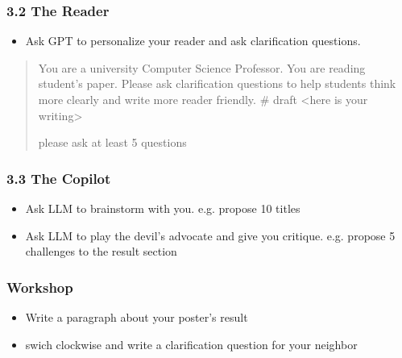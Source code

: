 \documentclass{beamer}
\begin{document}
\begin{frame}
    \frametitle{3.2 The Reader}
    \begin{itemize}
        \item Ask GPT to personalize your reader and ask clarification questions.
    \end{itemize}
    \begin{quote}
        You are a university Computer Science Professor. You are reading student's paper. \newline
        Please ask clarification questions to help students think more clearly and write more reader friendly.
        \newline
        \# draft \newline
        <here is your writing>
        
        please ask at least 5 questions
    \end{quote}
\end{frame}   


\begin{frame}
    \frametitle{3.3 The Copilot}
    \begin{itemize}
        \item Ask LLM to brainstorm with you. e.g. propose 10 titles
        \item Ask LLM to play the devil's advocate and give you critique. e.g. propose 5 challenges to the result section
    \end{itemize}
\end{frame}   


\begin{frame}
    \frametitle{Workshop}
    \begin{itemize}
        \item Write a paragraph about your poster's result
        \item swich clockwise and write a clarification question for your neighbor
    \end{itemize}
\end{frame}   
\end{document}
